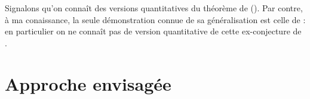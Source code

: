 \documentclass[a4paper, 11pt]{article}
\begin{document}
Signalons qu'on connaît des versions quantitatives du théorème de 
(). Par contre, à ma conaissance, la seule démonstration connue de
sa généralisation est celle de  : en particulier on ne connaît
pas de version quantitative de cette ex-conjecture de .

\section{Approche envisagée}\label{s-approche}
\end{document}
